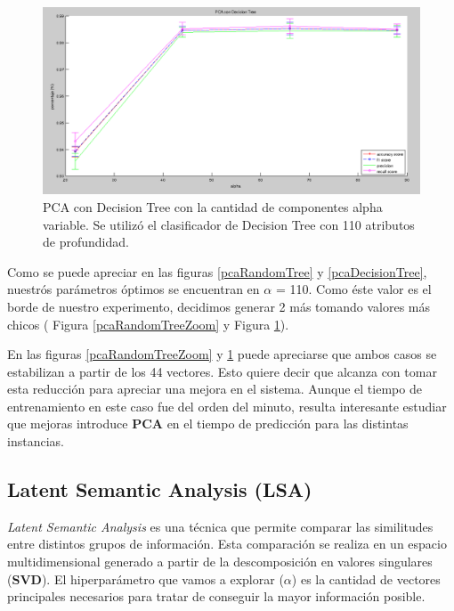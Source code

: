 \documentclass{article}
\begin{document}
\begin{figure}[H] %
\begin{center}
\includegraphics[width=500pt]{pcaDecisionTreeZoom.png}
\caption{PCA con Decision Tree con la cantidad de componentes alpha variable. Se utilizó el clasificador de Decision Tree con 110 atributos de profundidad.}
\label{pcaDecisionTreeZoom}
\end{center}
\end{figure}

Como se puede apreciar en las figuras \ref{pcaRandomTree} y \ref{pcaDecisionTree}, nuestrós parámetros óptimos se encuentran en $\alpha$ = 110. Como éste valor es el borde de nuestro experimento, decidimos generar 2 más tomando valores más chicos ( Figura \ref{pcaRandomTreeZoom} y Figura \ref{pcaDecisionTreeZoom}).

En las figuras \ref{pcaRandomTreeZoom} y \ref{pcaDecisionTreeZoom} puede apreciarse que ambos casos se estabilizan a partir de los 44 vectores. Esto quiere decir que alcanza con tomar esta reducción para apreciar una mejora en el sistema. Aunque el tiempo de entrenamiento en este caso fue del orden del minuto, resulta interesante estudiar que mejoras introduce \textbf{PCA} en el tiempo de predicción para las distintas instancias.

\subsection{Latent Semantic Analysis (LSA)}
\textit{Latent Semantic Analysis} es una técnica que permite comparar las similitudes entre distintos grupos de información. Esta comparación se realiza en un espacio multidimensional generado a partir de la descomposición en valores singulares (\textbf{SVD}). El hiperparámetro que vamos a explorar ($\alpha$) es la cantidad de vectores principales necesarios para tratar de conseguir la mayor información posible.
\end{document}
